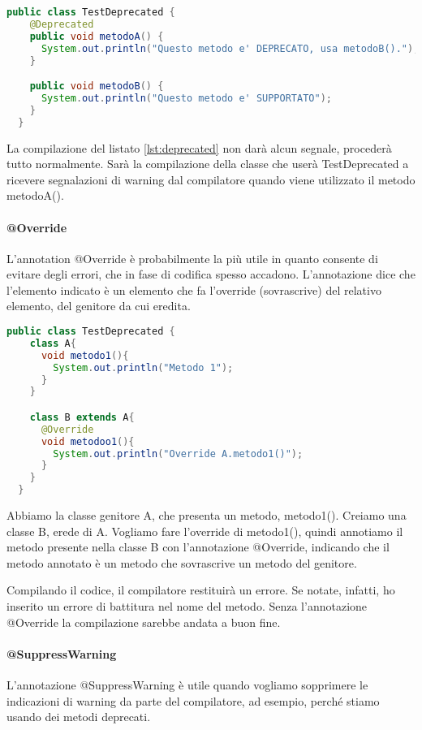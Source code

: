 \documentclass[a4paper,12pt,twoside]{book}
\begin{document}
\begin{lstlisting}[caption={}, label={lst:deprecated}, language=Java]
  public class TestDeprecated {
    @Deprecated
    public void metodoA() {
      System.out.println("Questo metodo e' DEPRECATO, usa metodoB().");
    }

    public void metodoB() {
      System.out.println("Questo metodo e' SUPPORTATO");
    }
  }


\end{lstlisting}

La compilazione del listato \ref{lst:deprecated} non darà alcun
segnale, procederà tutto normalmente. Sarà la compilazione della
classe che userà TestDeprecated a ricevere segnalazioni di warning dal
compilatore quando viene utilizzato il metodo metodoA().


\paragraph{@Override} 
L'annotation @Override è probabilmente la più utile in quanto consente
di evitare degli errori, che in fase di codifica spesso
accadono. L'annotazione dice che l'elemento indicato è un elemento che
fa l'override (sovrascrive) del relativo elemento, del genitore da cui
eredita.

\begin{lstlisting}[caption={}, label={lst:override}, language=Java]
  public class TestDeprecated {
    class A{
      void metodo1(){
        System.out.println("Metodo 1");
      }
    }

    class B extends A{
      @Override
      void metodoo1(){
        System.out.println("Override A.metodo1()");
      }
    }
  }
\end{lstlisting}

Abbiamo la classe genitore A, che presenta un metodo,
metodo1(). Creiamo una classe B, erede di A. Vogliamo fare l'override
di metodo1(), quindi annotiamo il metodo presente nella classe B con
l'annotazione @Override, indicando che il metodo annotato è un metodo
che sovrascrive un metodo del genitore.

Compilando il codice, il compilatore restituirà un errore. Se
notate, infatti, ho inserito un errore di battitura nel nome del
metodo. Senza l'annotazione @Override la compilazione sarebbe andata a
buon fine.


\paragraph{@SuppressWarning}
L'annotazione @SuppressWarning è utile quando vogliamo sopprimere le
indicazioni di warning da parte del compilatore, ad esempio, perché
stiamo usando dei metodi deprecati.
\end{document}
